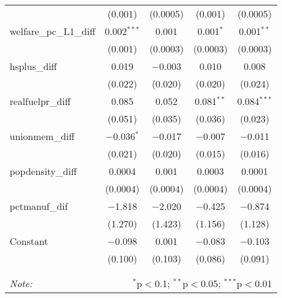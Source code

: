 \begin{table}[!htbp]
\begin{tabular}{@{\extracolsep{5pt}}lcccc}
  & (0.001) & (0.0005) & (0.001) & (0.0005) \\ 
  welfare\_pc\_L1\_diff & 0.002$^{***}$ & 0.001 & 0.001$^{*}$ & 0.001$^{**}$ \\ 
  & (0.001) & (0.0003) & (0.0003) & (0.0003) \\ 
  hsplus\_diff & 0.019 & $-$0.003 & 0.010 & 0.008 \\ 
  & (0.022) & (0.020) & (0.020) & (0.024) \\ 
  realfuelpr\_diff & 0.085 & 0.052 & 0.081$^{**}$ & 0.084$^{***}$ \\ 
  & (0.051) & (0.035) & (0.036) & (0.023) \\ 
  unionmem\_diff & $-$0.036$^{*}$ & $-$0.017 & $-$0.007 & $-$0.011 \\ 
  & (0.021) & (0.020) & (0.015) & (0.016) \\ 
  popdensity\_diff & 0.0004 & 0.001 & 0.0003 & 0.0001 \\ 
  & (0.0004) & (0.0004) & (0.0004) & (0.0004) \\ 
  pctmanuf\_dif & $-$1.818 & $-$2.020 & $-$0.425 & $-$0.874 \\ 
  & (1.270) & (1.423) & (1.156) & (1.128) \\ 
  Constant & $-$0.098 & 0.001 & $-$0.083 & $-$0.103 \\ 
  & (0.100) & (0.103) & (0.086) & (0.091) \\ 
 \hline \\[-1.8ex] 
\hline 
\hline \\[-1.8ex] 
\textit{Note:}  & \multicolumn{4}{r}{$^{*}$p$<$0.1; $^{**}$p$<$0.05; $^{***}$p$<$0.01} \\ 
\end{tabular} 
\end{table} 
